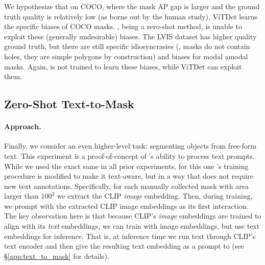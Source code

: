 We hypothesize that on COCO, where the mask AP gap is larger and the ground truth quality is relatively low (as borne out by the human study), ViTDet learns the specific biases of COCO masks. \sam, being a zero-shot method, is unable to exploit these (generally undesirable) biases. The LVIS dataset has higher quality ground truth, but there are still specific idiosyncrasies (\eg, masks do not contain holes, they are simple polygons by construction) and biases for modal \vs amodal masks. Again, \sam is not trained to learn these biases, while ViTDet can exploit them.

\subsection{Zero-Shot Text-to-Mask}\label{sec:eval:text_to_mask}

\paragraph{Approach.} Finally, we consider an even higher-level task: segmenting objects from free-form text. This experiment is a proof-of-concept of \sam's ability to process text prompts. While we used the exact same \sam in all prior experiments, for this one \sam's training procedure is modified to make it text-aware, but in a way that does not require new text annotations. Specifically, for each manually collected mask with area larger than $\textrm{100}^\textrm{2}$ we extract the CLIP \emph{image} embedding. Then, during training, we prompt \sam with the extracted CLIP image embeddings as its first interaction. The key observation here is that because CLIP's \emph{image} embeddings are trained to align with its \emph{text} embeddings, we can train with image embeddings, but use text embeddings for inference. That is, at inference time we run text through CLIP's text encoder and then give the resulting text embedding as a prompt to \sam (see \S\ref{app:text_to_mask} for details).

